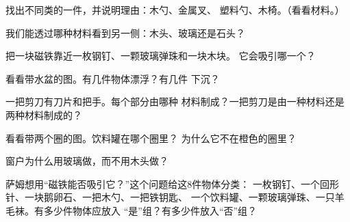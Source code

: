 \begin{exercise}[$\star$]\label{exo:g1:materials-around-us:4}
找出不同类的一件，并说明理由：木勺、金属叉、
塑料勺、木椅。（看看材料。）
\end{exercise}

\begin{exercise}[$\star$]\label{exo:g1:materials-around-us:5}
我们能透过哪种材料看到另一侧：木头、玻璃还是石头？
\end{exercise}

\begin{exercise}[$\star$]\label{exo:g1:materials-around-us:6}
把一块磁铁靠近一枚钢钉、一颗玻璃弹珠和一块木块。
它会吸引哪一个？
\end{exercise}

\begin{exercise}[$\star$]\label{exo:g1:materials-around-us:7}
看看带水盆的图。有几件物体漂浮？有几件
下沉？
\end{exercise}

\begin{exercise}[$\star$]\label{exo:g1:materials-around-us:8}
一把剪刀有刀片和把手。每个部分由哪种
材料制成？一把剪刀是由一种材料还是两种材料制成的？
\end{exercise}

\begin{exercise}[$\star$]\label{exo:g1:materials-around-us:9}
看看带两个圈的图。饮料罐在哪个圈里？
为什么它不在橙色的圈里？
\end{exercise}

\begin{exercise}[$\star\star$]\label{exo:g1:materials-around-us:10}
窗户为什么用玻璃做，而不用木头做？
\end{exercise}

\begin{exercise}[$\star\star$]\label{exo:g1:materials-around-us:11}
萨姆想用“磁铁能否吸引它？”这个问题给这8件物体分类：
一枚钢钉、一个回形针、一块鹅卵石、一把木勺、一把铁钥匙、
一个饮料罐、一颗玻璃弹珠、一只羊毛袜。有多少件物体应放入
“是”组？有多少件放入“否”组？
\end{exercise}
